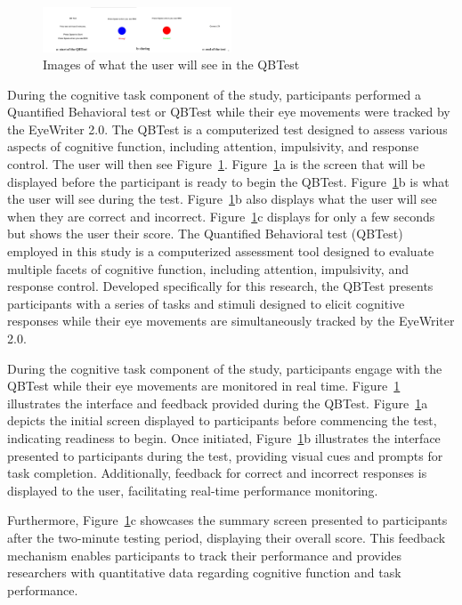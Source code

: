 \documentclass[manuscript, screen, review]{acmart} %
\begin{document}
\begin{figure}
  \includegraphics[width=0.5\textwidth]{qbTest.png}
  \caption{Images of what the user will see in the QBTest}
  \label{QBTest}
\end{figure}

During the cognitive task component of the study, participants performed a Quantified Behavioral test or QBTest while their eye movements were tracked by the EyeWriter 2.0.
The QBTest is a computerized test designed to assess various aspects of cognitive function, including attention, impulsivity, and response control.
The user will then see Figure~\ref{QBTest}. Figure~\ref{QBTest}a is the screen that will be displayed before the participant is ready to begin the QBTest.
Figure~\ref{QBTest}b is what the user will see during the test. Figure~\ref{QBTest}b also displays what the user will see when they are correct and incorrect.
Figure~\ref{QBTest}c displays for only a few seconds but shows the user their score.
The Quantified Behavioral test (QBTest) employed in this study is a computerized assessment tool designed to evaluate multiple facets of cognitive function, including attention, impulsivity, and response control. Developed specifically for this research, the QBTest presents participants with a series of tasks and stimuli designed to elicit cognitive responses while their eye movements are simultaneously tracked by the EyeWriter 2.0.

During the cognitive task component of the study, participants engage with the QBTest while their eye movements are monitored in real time. Figure~\ref{QBTest} illustrates the interface and feedback provided during the QBTest. Figure~\ref{QBTest}a depicts the initial screen displayed to participants before commencing the test, indicating readiness to begin. Once initiated, Figure~\ref{QBTest}b illustrates the interface presented to participants during the test, providing visual cues and prompts for task completion. Additionally, feedback for correct and incorrect responses is displayed to the user, facilitating real-time performance monitoring.

Furthermore, Figure~\ref{QBTest}c showcases the summary screen presented to participants after the two-minute testing period, displaying their overall score. This feedback mechanism enables participants to track their performance and provides researchers with quantitative data regarding cognitive function and task performance.
\end{document}
